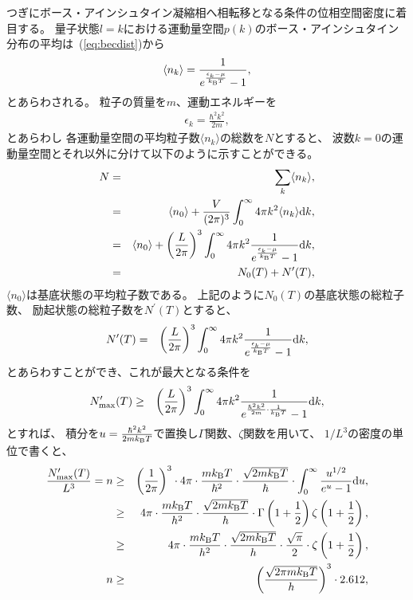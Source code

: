 \documentclass[12pt,a4paper]{jbook}
\newcommand{\diff}{\mathrm{d}}				%
\newcommand{\kb} {k_{\rm B}}				%
\begin{document}
        つぎにボース・アインシュタイン凝縮相へ相転移となる条件の位相空間密度に着目する。
        量子状態$l=k$における運動量空間$p(k)$のボース・アインシュタイン分布の平均は~(\ref{eq:becdist})から
        \begin{eqnarray}
		    \langle n_k \rangle = \frac{1}{e^{\frac{\epsilon_k - \mu}{\kb T}} - 1},
        \end{eqnarray}
        とあらわされる。
        粒子の質量を$m$、運動エネルギーを
        \begin{eqnarray}
		    \epsilon_k = \frac{\hbar^2 k^2}{2 m},
        \end{eqnarray}
        とあらわし
        各運動量空間の平均粒子数$\langle n_k \rangle$の総数を$N$とすると、
        波数$k=0$の運動量空間とそれ以外に分けて以下のように示すことができる。
		\begin{eqnarray}
			N & = & \sum_k \langle n_k \rangle, \nonumber
			\\
			& = & \langle n_0 \rangle  + \frac{V}{(2\pi)^3} \int_0^\infty 4 \pi k^2 
			\langle n_k \rangle \diff k, \nonumber
			\\
			& = & \langle n_0 \rangle + \left( \frac{L}{2\pi} \right)^3 \int_0^\infty 4 \pi k^2
			\frac{1}{e^{\frac{\epsilon_k - \mu}{\kb T}} - 1} \diff k, \nonumber
			\\
			& = & N_0(T) + N^\prime(T),
		\end{eqnarray}
		$\langle n_0 \rangle$は基底状態の平均粒子数である。
		上記のように$N_0(T)$の基底状態の総粒子数、
        励起状態の総粒子数を$N^\prime(T)$とすると、
		\begin{eqnarray}
			N^\prime(T) & = & \left(\frac{L}{2 \pi}\right)^3 \int_0^\infty 4 \pi k^2
			 \frac{1}{e^{\frac{\epsilon_k - \mu}{\kb T}} - 1}  \diff k,
		\end{eqnarray}
        とあらわすことができ、これが最大となる条件を
		\begin{eqnarray}
			N^\prime_{{\rm max}}(T) & \ge & \left(\frac{L}{2 \pi}\right)^3 \int_0^\infty 4 \pi k^2
			 \frac{1}{e^{\frac{\hbar^2 k^2}{2 m} \cdot \frac{1}{\kb T}} - 1}  \diff k,
		\end{eqnarray}
        とすれば、
		積分を$u = \frac{\hbar^2 k^2}{2 m \kb T}$で置換し$\Gamma$関数、$\zeta$関数を用いて、
        $1/L^3$の密度の単位で書くと、
		\begin{eqnarray}
			\frac{N^\prime_{{\rm max}}(T)}{L^3} = n  & \ge & \left(\frac{1}{2 \pi} \right)^3 \cdot
			4 \pi \cdot \frac{m \kb T}{\hbar^2} \cdot \frac{\sqrt{2 m \kb T}}{\hbar} \cdot
			\int_0^\infty \frac{u^{1/2}}{e^u - 1} \diff u,
			\\
			& \ge & 4 \pi \cdot \frac{m \kb T}{h^2} \cdot \frac{\sqrt{2 m \kb T}}{h}
			\cdot \Gamma \left( 1+\frac{1}{2}\right) \zeta \left( 1+\frac{1}{2}\right), \nonumber
			\\
			& \ge & 4 \pi \cdot \frac{m \kb T}{h^2} \cdot \frac{\sqrt{2 m \kb T}}{h}
			\cdot \frac{\sqrt{\pi}}{2}\cdot \zeta \left( 1+\frac{1}{2}\right), \nonumber
			\\
			n & \ge & \left( \frac{\sqrt{2 \pi m \kb T}}{h} \right)^{3} \cdot 2.612,
		\end{eqnarray}
\end{document}

